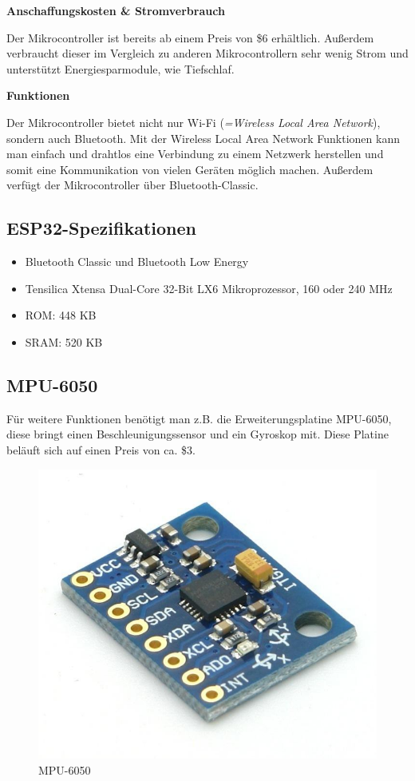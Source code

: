 \textbf{Anschaffungskosten \& Stromverbrauch}

Der Mikrocontroller ist bereits ab einem Preis von \$6 erhältlich. Außerdem verbraucht dieser im Vergleich zu anderen Mikrocontrollern sehr wenig Strom und unterstützt Energiesparmodule, wie Tiefschlaf.

\textbf{Funktionen}

Der Mikrocontroller bietet nicht nur Wi-Fi (\emph{=Wireless Local Area Network}), sondern auch Bluetooth. Mit der Wireless Local Area Network Funktionen kann man einfach und drahtlos eine Verbindung zu einem Netzwerk herstellen und somit eine Kommunikation von vielen Geräten möglich machen. Außerdem verfügt der Mikrocontroller über Bluetooth-Classic.

\subsection{ESP32-Spezifikationen}

\begin{itemize}
	\item Bluetooth Classic und Bluetooth Low Energy
	\item Tensilica Xtensa Dual-Core 32-Bit LX6 Mikroprozessor, 160 oder 240 MHz
	\item ROM:  448 KB
	\item SRAM:  520 KB 
\end{itemize}

\subsection{MPU-6050}

Für weitere Funktionen benötigt man z.B. die Erweiterungsplatine MPU-6050, diese bringt einen Beschleunigungssensor und ein Gyroskop mit. Diese Platine beläuft sich auf einen Preis von ca. \$3.

\begin{figure}[H]
	\centering
	\includegraphics[width=0.7\linewidth]{images/MPU6050.jpg}
	\caption[MPU6050]{MPU-6050}
	\label{fig:MPU6050}
\end{figure}


